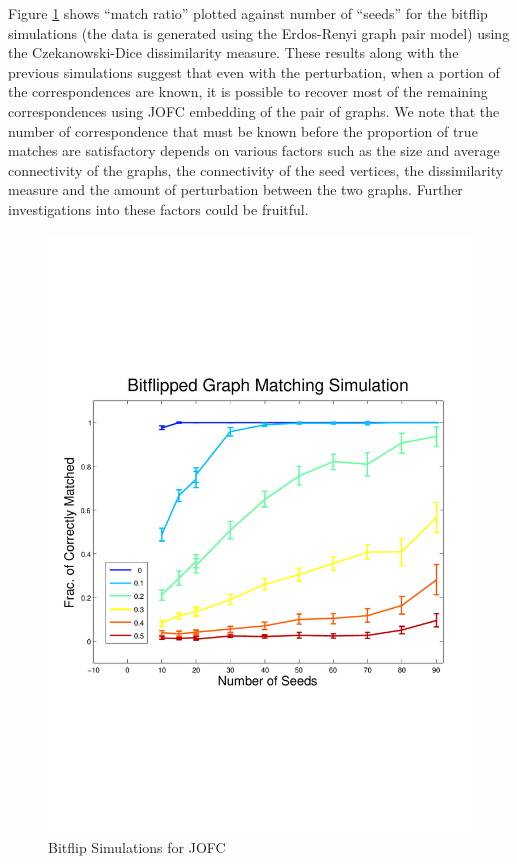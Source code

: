 \documentclass[12pt,oneside,final]{thesis}
\begin{document}
Figure \ref{fig:bitflipJOFC} shows ``match ratio'' plotted against number of ``seeds'' for the bitflip simulations (the data is generated using the Erdos-Renyi graph pair model) using the Czekanowski-Dice dissimilarity measure. These results along with the previous simulations suggest that even with the perturbation, when a portion of the correspondences are known, it is possible to recover most of the remaining correspondences using JOFC embedding of the pair of graphs. We note that the number of correspondence that must be known before the proportion of true matches are satisfactory depends on various factors such as the size and average connectivity of the graphs, the connectivity of the seed vertices, the dissimilarity measure and the amount of perturbation between the two graphs. Further investigations into these factors could be fruitful. 
\begin{figure}
\includegraphics[scale=0.75]{bitflip_JOFC}
\caption{Bitflip Simulations for JOFC \label{fig:bitflipJOFC}}
\end{figure}
\end{document}
